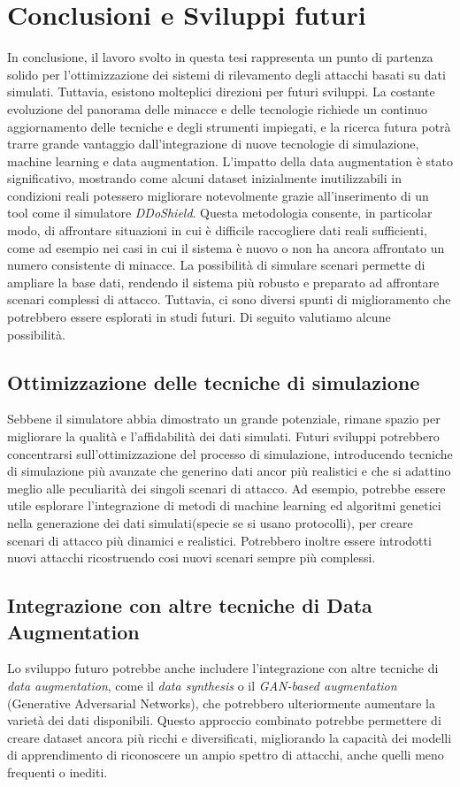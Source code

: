 \chapter{Conclusioni e Sviluppi futuri}
In conclusione, il lavoro svolto in questa tesi rappresenta un punto di partenza solido per l'ottimizzazione dei sistemi di rilevamento degli attacchi basati su dati simulati. Tuttavia, esistono molteplici direzioni per futuri sviluppi. La costante evoluzione del panorama delle minacce e delle tecnologie richiede un continuo aggiornamento delle tecniche e degli strumenti impiegati, e la ricerca futura potrà trarre grande vantaggio dall'integrazione di nuove tecnologie di simulazione, machine learning e data augmentation.
L'impatto della data augmentation è stato significativo, mostrando come alcuni dataset inizialmente inutilizzabili in condizioni reali potessero migliorare notevolmente grazie all'inserimento di un tool come il simulatore \textit{DDoShield}. Questa metodologia consente, in particolar modo, di affrontare situazioni in cui è difficile raccogliere dati reali sufficienti, come ad esempio nei casi in cui il sistema è nuovo o non ha ancora affrontato un numero consistente di minacce. La possibilità di simulare scenari permette di ampliare la base dati, rendendo il sistema più robusto e preparato ad affrontare scenari complessi di attacco.
Tuttavia, ci sono diversi spunti di miglioramento che potrebbero essere esplorati in studi futuri. Di seguito valutiamo alcune possibilità.

\section{Ottimizzazione delle tecniche di simulazione}
Sebbene il simulatore abbia dimostrato un grande potenziale, rimane spazio per migliorare la qualità e l'affidabilità dei dati simulati. Futuri sviluppi potrebbero concentrarsi sull'ottimizzazione del processo di simulazione, introducendo tecniche di simulazione più avanzate che generino dati ancor più realistici e che si adattino meglio alle peculiarità dei singoli scenari di attacco. Ad esempio, potrebbe essere utile esplorare l'integrazione di metodi di machine learning ed algoritmi genetici nella generazione dei dati simulati(specie se si usano protocolli), per creare scenari di attacco più dinamici e realistici. 
Potrebbero inoltre essere introdotti nuovi attacchi ricostruendo cosi nuovi scenari sempre più complessi.

\section{Integrazione con altre tecniche di Data Augmentation}
Lo sviluppo futuro potrebbe anche includere l'integrazione con altre tecniche di \textit{data augmentation}, come il \textit{data synthesis} o il \textit{GAN-based augmentation} (Generative Adversarial Networks), che potrebbero ulteriormente aumentare la varietà dei dati disponibili.\cite{GAN} Questo approccio combinato potrebbe permettere di creare dataset ancora più ricchi e diversificati, migliorando la capacità dei modelli di apprendimento di riconoscere un ampio spettro di attacchi, anche quelli meno frequenti o inediti.

